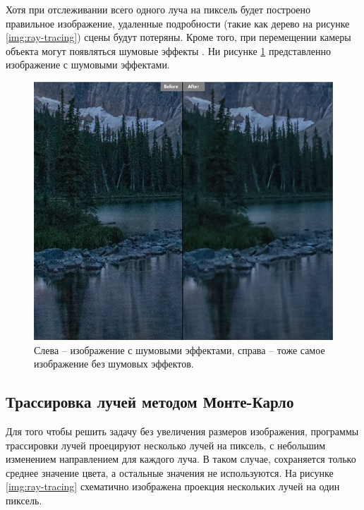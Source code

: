 Хотя при отслеживании всего одного луча на пиксель будет построено правильное изображение, удаленные подробности (такие как дерево на рисунке \ref{img:ray-tracing}) сцены будут потеряны. Кроме того, при перемещении камеры объекта могут появляться шумовые эффекты \cite{what-is-noise}. Ни рисунке \ref{img:noise-example} представленно изображение с шумовыми эффектами.

\begin{figure}[H]
	\begin{center}
		\includegraphics[scale=0.8]{img/noise-example.jpg}
	\end{center}
	\captionsetup{justification=centering}
	\caption{Слева -- изображение с шумовыми эффектами, справа -- тоже самое изображение без шумовых эффектов.}
	\label{img:noise-example}
\end{figure}


\subsection{Трассировка лучей методом Монте-Карло}

Для того чтобы решить задачу без увеличения размеров изображения, программы трассировки лучей проецируют несколько лучей на пиксель, с небольшим изменением направлением для каждого луча. В таком случае, сохраняется только среднее значение цвета, а остальные значения не используются. На рисунке \ref{img:ray-tracing} схематично изображена проекция нескольких лучей на один пиксель.

